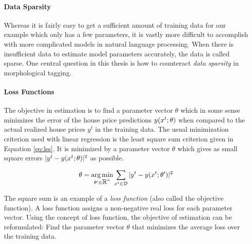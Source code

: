 \paragraph{Data Sparsity} Whereas it is fairly easy to get a
sufficient amount of training data for our example which only has a
few parameters, it is vastly more difficult to accomplish with more
complicated models in natural language processing. When there is
insufficient data to estimate model parameters accurately, the data is
called sparse. One central question in this thesis is how to
counteract {\it data sparsity} in morphological tagging.

\paragraph{Loss Functions} The objective in estimation is to find a
parameter vector $\theta$ which in some sense minimizes the error of
the house price predictions $y(x^t\mbox{$ ; \, $} \theta)$ when compared to
the actual realized house prices $y^t$ in the training data. The usual
minimization criterion used with linear regression is the least square
sum criterion given in Equation \ref{eq:lss}. It is minimized by a
parameter vector $\theta$ which gives as small square errors $|y^t -
y(x^t \mbox{$ ; \, $} \theta)|^2$ as possible.

\begin{equation}
\theta = \operatorname*{arg\,min}_{\theta' \in \mbox{$\mathbb R$}^n} \sum_{x^t \in \mathcal{D}} | y^t - y(x^t\mbox{$ ; \, $} \theta')|^2\label{eq:lss}
\end{equation}

The square sum is an example of a {\it loss function} (also called the
objective function). A loss function assigns a non-negative real loss
for each parameter vector. Using the concept of loss function, the
objective of estimation can be reformulated: Find the parameter vector
$\theta$ that minimizes the average loss over the training data.


